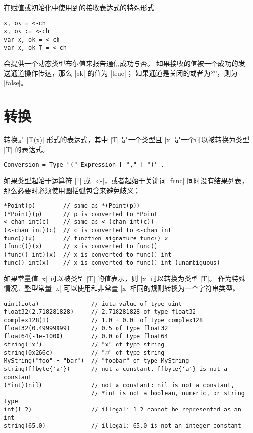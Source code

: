在赋值或初始化中使用到的接收表达式的特殊形式
\begin{lstlisting}[style=golang]
x, ok = <-ch
x, ok := <-ch
var x, ok = <-ch
var x, ok T = <-ch
\end{lstlisting}
会提供一个动态类型布尔值来报告通信成功与否。
如果接收的值被一个成功的发送通道操作传达，那么 \gocode|ok| 的值为 \gocode|true|；
如果通道是关闭的或者为空，则为 \gocode|false|。

\section{转换}
转换是 \code|T(x)| 形式的表达式，其中 \code|T| 是一个类型且 \code|x| 是一个可以被转换为类型 \code|T| 的表达式。
\begin{lstlisting}[style=EBNF]
Conversion = Type "(" Expression [ "," ] ")" .
\end{lstlisting}
如果类型起始于运算符 \code|*| 或 \code|<-|，或者起始于关键词 \code|func| 同时没有结果列表，那么必要时必须使用圆括弧包含来避免歧义；
\begin{lstlisting}[style=golang]
*Point(p)        // same as *(Point(p))
(*Point)(p)      // p is converted to *Point
<-chan int(c)    // same as <-(chan int(c))
(<-chan int)(c)  // c is converted to <-chan int
func()(x)        // function signature func() x
(func())(x)      // x is converted to func()
(func() int)(x)  // x is converted to func() int
func() int(x)    // x is converted to func() int (unambiguous)
\end{lstlisting}
如果常量值 \code|x| 可以被类型 \code|T| 的值表示，则 \code|x| 可以转换为类型 \code|T|。
作为特殊情况，整型常量 \code|x| 可以使用和非常量 \code|x| 相同的规则转换为一个字符串类型。
\begin{lstlisting}[style=golang]
uint(iota)               // iota value of type uint
float32(2.718281828)     // 2.718281828 of type float32
complex128(1)            // 1.0 + 0.0i of type complex128
float32(0.49999999)      // 0.5 of type float32
float64(-1e-1000)        // 0.0 of type float64
string('x')              // "x" of type string
string(0x266c)           // "♬" of type string
MyString("foo" + "bar")  // "foobar" of type MyString
string([]byte{'a'})      // not a constant: []byte{'a'} is not a constant
(*int)(nil)              // not a constant: nil is not a constant, 
						 // *int is not a boolean, numeric, or string type
int(1.2)                 // illegal: 1.2 cannot be represented as an int
string(65.0)             // illegal: 65.0 is not an integer constant
\end{lstlisting}

